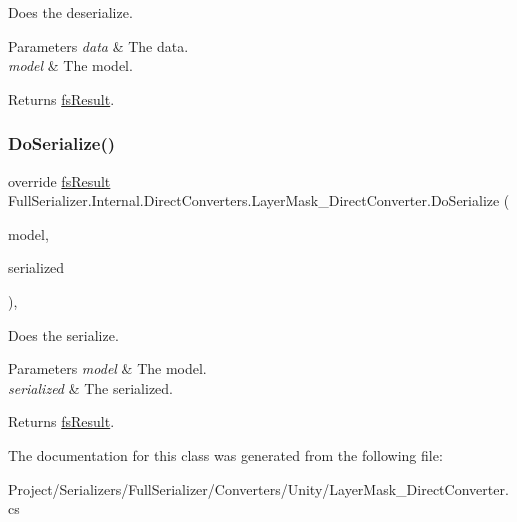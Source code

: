 Does the deserialize. 


\begin{DoxyParams}{Parameters}
{\em data} & The data.\\
\hline
{\em model} & The model.\\
\hline
\end{DoxyParams}
\begin{DoxyReturn}{Returns}
\hyperlink{struct_full_serializer_1_1fs_result}{fs\+Result}.
\end{DoxyReturn}
\mbox{\label{class_full_serializer_1_1_internal_1_1_direct_converters_1_1_layer_mask___direct_converter_ac05514b589b5f07dc821d17e23f09a80}} 
\subsubsection{\texorpdfstring{Do\+Serialize()}{DoSerialize()}}
{\footnotesize\ttfamily override \hyperlink{struct_full_serializer_1_1fs_result}{fs\+Result} Full\+Serializer.\+Internal.\+Direct\+Converters.\+Layer\+Mask\+\_\+\+Direct\+Converter.\+Do\+Serialize (\begin{DoxyParamCaption}\item[{Layer\+Mask}]{model,  }\item[{Dictionary$<$ string, \hyperlink{class_full_serializer_1_1fs_data}{fs\+Data} $>$}]{serialized }\end{DoxyParamCaption})\hspace{0.3cm}{\ttfamily [inline]}, {\ttfamily [protected]}}



Does the serialize. 


\begin{DoxyParams}{Parameters}
{\em model} & The model.\\
\hline
{\em serialized} & The serialized.\\
\hline
\end{DoxyParams}
\begin{DoxyReturn}{Returns}
\hyperlink{struct_full_serializer_1_1fs_result}{fs\+Result}.
\end{DoxyReturn}


The documentation for this class was generated from the following file\+:\begin{DoxyCompactItemize}
\item 
Project/\+Serializers/\+Full\+Serializer/\+Converters/\+Unity/Layer\+Mask\+\_\+\+Direct\+Converter.\+cs\end{DoxyCompactItemize}
